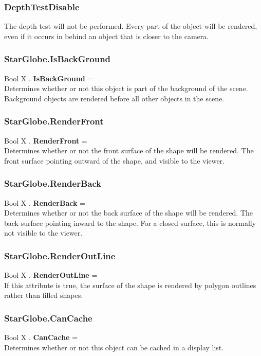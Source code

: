 \documentclass[10pt]{book}
\begin{document}
\subsubsection{DepthTestDisable \label{T:DepthTest|DepthTestDisable}}
The depth test will not be performed. Every part of the object will be rendered, even if it occurs in behind an object that is closer to the camera.

\subsubsection{StarGlobe.IsBackGround \label{F:StarGlobe:IsBackGround}}
Bool X . \textbf{IsBackGround} = \\
Determines whether or not this object is part of the background of the scene. Background objects are rendered before all other objects in the scene.

\subsubsection{StarGlobe.RenderFront \label{F:StarGlobe:RenderFront}}
Bool X . \textbf{RenderFront} = \\
Determines whether or not the front surface of the shape will be rendered. The front surface pointing outward of the shape, and visible to the viewer.

\subsubsection{StarGlobe.RenderBack \label{F:StarGlobe:RenderBack}}
Bool X . \textbf{RenderBack} = \\
Determines whether or not the back surface of the shape will be rendered. The back surface pointing inward to the shape. For a closed surface, this is normally not visible to the viewer.

\subsubsection{StarGlobe.RenderOutLine \label{F:StarGlobe:RenderOutLine}}
Bool X . \textbf{RenderOutLine} = \\
If this attribute is true, the surface of the shape is rendered by polygon outlines rather than filled shapes.

\subsubsection{StarGlobe.CanCache \label{F:StarGlobe:CanCache}}
Bool X . \textbf{CanCache} = \\
Determines whether or not this object can be cached in a display list.
\end{document}
